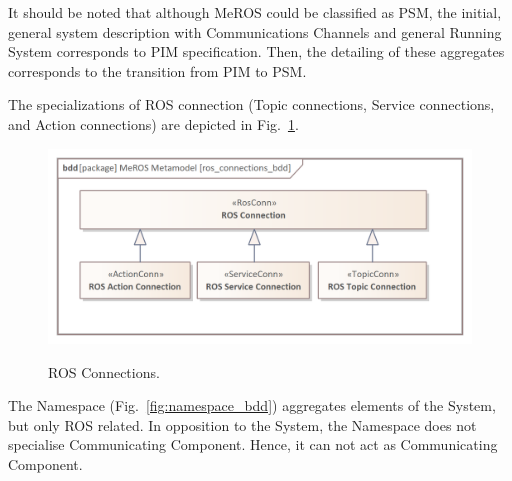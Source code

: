 \documentclass[11pt,oneside,a4paper]{report}
\begin{document}
	It should be noted that although MeROS could be classified as PSM, the initial, general system description with Communications Channels and general Running System corresponds to PIM specification. Then, the detailing of these aggregates corresponds to the transition from PIM to PSM. 
	
		
%
%
	
		 The specializations of ROS connection (Topic connections, Service connections, and Action connections) are depicted in Fig.~\ref{fig:ros_connections_bdd}. 
	
	
	\begin{figure}[H]
		\centering
		\begin{center}
			{\includegraphics[scale=1.0]{img/meros_pkg/ros_connections_bdd.png}}
		\end{center}
		\caption{ROS Connections.} 
		\label{fig:ros_connections_bdd}
	\end{figure}

	
	The Namespace (Fig.~\ref{fig:namespace_bdd}) aggregates elements of the System, but only ROS related. In opposition to the System, the Namespace does not specialise Communicating Component. Hence, it can not act as Communicating Component.
	
\end{document}
